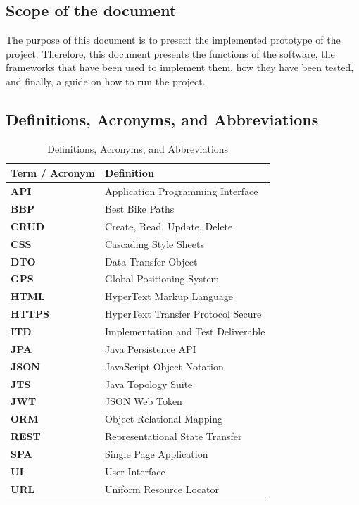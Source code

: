 \subsection{Scope of the document}
The purpose of this document is to present the implemented prototype of the project. Therefore, this document presents the functions of the software, the frameworks that have been used to implement them, how they have been tested, and finally, a guide on how to run the project.

\subsection{Definitions, Acronyms, and Abbreviations}
\begin{table}[H]
\centering
\renewcommand{\arraystretch}{1.5}
\begin{tabular}{|p{3.5cm}|p{10cm}|}
\hline
\textbf{Term / Acronym} & \textbf{Definition} \\
\hline
\textbf{API} & Application Programming Interface \\
\hline
\textbf{BBP} & Best Bike Paths \\
\hline
\textbf{CRUD} & Create, Read, Update, Delete \\
\hline
\textbf{CSS} & Cascading Style Sheets \\
\hline
\textbf{DTO} & Data Transfer Object \\
\hline
\textbf{GPS} & Global Positioning System \\
\hline
\textbf{HTML} & HyperText Markup Language \\
\hline
\textbf{HTTPS} & HyperText Transfer Protocol Secure \\
\hline
\textbf{ITD} & Implementation and Test Deliverable \\
\hline
\textbf{JPA} & Java Persistence API \\
\hline
\textbf{JSON} & JavaScript Object Notation \\
\hline
\textbf{JTS} & Java Topology Suite \\
\hline
\textbf{JWT} & JSON Web Token \\
\hline
\textbf{ORM} & Object-Relational Mapping \\
\hline
\textbf{REST} & Representational State Transfer \\
\hline
\textbf{SPA} & Single Page Application \\
\hline
\textbf{UI} & User Interface \\
\hline
\textbf{URL} & Uniform Resource Locator \\
\hline
\end{tabular}
\caption{Definitions, Acronyms, and Abbreviations}
\label{tab:definitions_itd}
\end{table}


